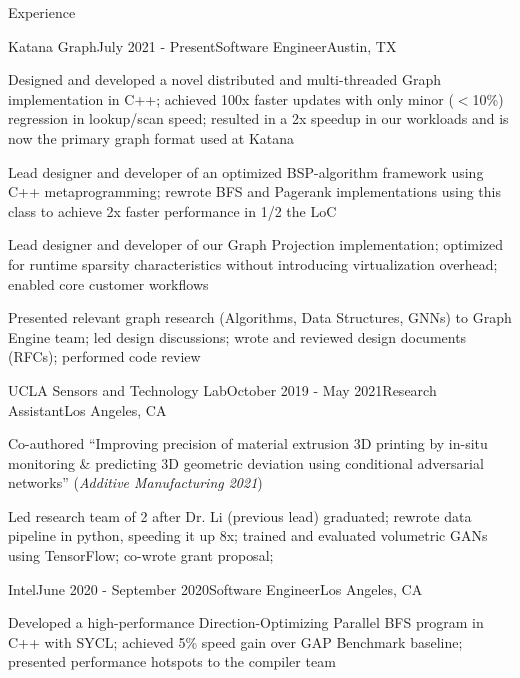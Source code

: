 \documentclass[ 10.5pt ]{resume}
\begin{document}
\begin{rSection}{Experience}

	\begin{rSubsection}{Katana Graph}{July 2021 - Present}{Software Engineer}{Austin, TX}
		\item Designed and developed a novel distributed and multi-threaded Graph implementation in C++; achieved 100x faster updates with only minor ($<$10\%) regression in lookup/scan speed; resulted in a 2x speedup in our workloads and is now the primary graph format used at Katana
		\item Lead designer and developer of an optimized BSP-algorithm framework using C++ metaprogramming; rewrote BFS and Pagerank implementations using this class to achieve 2x faster performance in 1/2 the LoC
		\item Lead designer and developer of our Graph Projection implementation; optimized for runtime sparsity characteristics without introducing virtualization overhead; enabled core customer workflows
		\item Presented relevant graph research (Algorithms, Data Structures, GNNs) to Graph Engine team; led design discussions; wrote and reviewed design documents (RFCs); performed code review
	\end{rSubsection}


	\begin{rSubsection}{UCLA Sensors and Technology Lab}{October 2019 - May 2021}{Research Assistant}{Los Angeles, CA}
		\item Co-authored “Improving precision of material extrusion 3D printing by in-situ monitoring \& predicting 3D geometric deviation using conditional adversarial networks” (\textit{Additive Manufacturing 2021})
		\item Led research team of 2 after Dr. Li (previous lead) graduated; rewrote data pipeline in python, speeding it up 8x; trained and evaluated volumetric GANs using TensorFlow; co-wrote grant proposal;
	\end{rSubsection}


	\begin{rSubsection}{Intel}{June 2020 - September 2020}{Software Engineer}{Los Angeles, CA}
		\item Developed a high-performance Direction-Optimizing Parallel BFS program in C++ with SYCL; achieved 5\% speed gain over GAP Benchmark baseline; presented performance hotspots to the compiler team
	\end{rSubsection}

\end{rSection}
\end{document}

